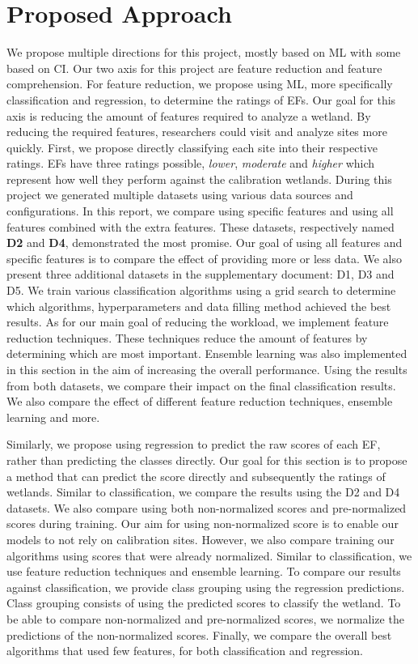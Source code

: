 \documentclass[12pt,letterpaper]{article}
\begin{document}
\section{Proposed Approach}\label{sec:PA}
We propose multiple directions for this project, mostly based on \ac{ML} with some based on \ac{CI}.
Our two axis for this project are feature reduction and feature comprehension.
For feature reduction, we propose using \ac{ML}, more specifically classification and regression, to determine the ratings of \ac{EF}s.
Our goal for this axis is reducing the amount of features required to analyze a wetland.
By reducing the required features, researchers could visit and analyze sites more quickly.
First, we propose directly classifying each site into their respective ratings.
\ac{EF}s have three ratings possible, \textit{lower}, \textit{moderate} and \textit{higher} which represent how well they perform against the calibration wetlands.
During this project we generated multiple datasets using various data sources and configurations.
In this report, we compare using specific features and using all features combined with the extra features.
These datasets, respectively named \textbf{D2} and \textbf{D4}, demonstrated the most promise.
Our goal of using all features and specific features is to compare the effect of providing more or less data.
We also present three additional datasets in the supplementary document: D1, D3 and D5.
We train various classification algorithms using a grid search to determine which algorithms, hyperparameters and data filling method achieved the best results.
As for our main goal of reducing the workload, we implement feature reduction techniques.
These techniques reduce the amount of features by determining which are most important.
Ensemble learning was also implemented in this section in the aim of increasing the overall performance.
Using the results from both datasets, we compare their impact on the final classification results.
We also compare the effect of different feature reduction techniques, ensemble learning and more.

Similarly, we propose using regression to predict the raw scores of each \ac{EF}, rather than predicting the classes directly.
Our goal for this section is to propose a method that can predict the score directly and subsequently the ratings of wetlands.
Similar to classification, we compare the results using the D2 and D4 datasets.
We also compare using both non-normalized scores and pre-normalized scores during training.
Our aim for using non-normalized score is to enable our models to not rely on calibration sites.
However, we also compare training our algorithms using scores that were already normalized.
Similar to classification, we use feature reduction techniques and ensemble learning.
To compare our results against classification, we provide class grouping using the regression predictions.
Class grouping consists of using the predicted scores to classify the wetland.
To be able to compare non-normalized and pre-normalized scores, we normalize the predictions of  the non-normalized scores.
Finally, we compare the overall best algorithms that used few features, for both classification and regression.
\end{document}

